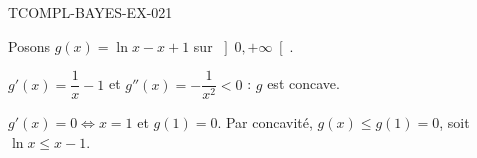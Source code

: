 \begin{corrige}{TCOMPL-BAYES-EX-021}

Posons $g(x) = \ln x - x + 1$ sur $\left]0, +\infty\right[$.


$g'(x) = \dfrac{1}{x} - 1$ et $g''(x) = -\dfrac{1}{x^2} < 0$ : $g$ est concave.

$g'(x) = 0 \iff x = 1$ et $g(1) = 0$. Par concavité, $g(x) \leq g(1) = 0$, soit $\ln x \leq x - 1$.

\end{corrige}

